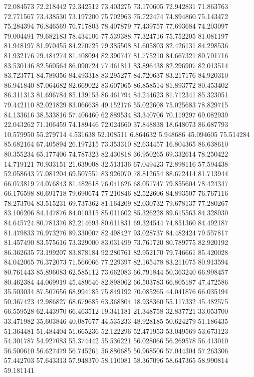 72.084573
72.218442
72.342512
73.403275
73.170605
72.942831
71.863763
72.771567
73.438530
73.197200
75.702963
75.722474
74.894860
75.143472
75.284394
76.846569
76.717803
78.407879
77.439757
77.693684
74.203097
79.004491
79.682183
78.434106
77.539388
77.324716
75.752205
81.081197
81.948197
81.970455
84.270725
79.385508
81.605803
82.426131
84.298536
81.932176
79.484274
81.408094
82.390747
81.775210
84.667321
80.701716
83.530146
82.560564
86.090724
77.461811
83.896438
82.296907
82.013514
83.723771
84.789356
84.493318
83.295277
84.720637
83.217176
84.920310
86.941840
87.064682
82.669022
83.607065
86.858514
81.893772
80.453402
86.311313
81.696784
85.139153
86.461794
84.244623
81.712341
85.323051
79.442110
82.021829
83.066638
49.152176
55.022608
75.025683
78.829715
84.133616
38.533816
57.406460
62.889534
83.340706
70.119297
69.082939
22.043262
71.106459
74.189446
72.024660
37.848838
18.648073
86.687793
10.579950
55.279714
4.531638
52.108511
6.864632
5.948686
45.094605
75.514284
85.682164
67.405894
26.197215
73.353310
82.634457
16.804365
86.638610
80.355234
65.177406
74.787323
82.430818
36.950265
69.332614
78.250422
14.719121
70.933151
21.639008
32.513136
67.049423
72.898116
57.594438
52.058643
77.081204
69.507551
83.926070
78.812654
88.672414
81.713944
66.073819
74.076843
81.482618
76.041626
68.051747
79.855604
78.424347
66.176598
80.691718
79.690674
77.210846
82.522606
84.893507
76.767116
78.273704
83.515231
69.737362
81.164209
82.030732
79.678137
77.280267
83.106206
84.147876
84.010315
85.011602
85.326228
89.615563
84.328030
84.645724
80.781376
82.214693
80.611831
69.324544
74.851360
84.492187
81.479833
76.973276
89.330007
82.498427
93.028737
84.482424
79.557817
81.457490
83.575616
73.329000
83.031499
73.761720
80.789775
82.920192
86.362635
73.199207
83.878184
92.280761
82.952170
79.746661
85.420028
84.042065
76.372073
71.566066
77.229397
82.165478
83.211075
80.913594
80.761443
85.896083
62.585112
73.662083
66.791844
50.363240
66.998457
80.462384
44.069919
45.489646
82.898062
66.503783
66.805187
47.472586
35.503034
87.507656
68.994185
75.849192
70.085265
44.041876
66.035194
50.367423
42.986827
68.679685
63.368804
18.938360
55.117332
45.482575
66.559528
62.443970
66.463512
19.341181
21.348758
32.837721
33.053700
33.471982
35.603846
40.087677
44.535233
48.928185
50.624279
51.186435
51.364481
51.484404
51.665236
52.122296
52.471953
53.049569
53.673123
54.301787
54.927083
55.374442
55.536221
56.028066
56.269578
56.413010
56.500610
56.627479
56.745261
56.886685
56.968506
57.044304
57.263306
57.442703
57.643313
57.948370
58.110081
58.367096
58.647365
58.990814
59.181141

